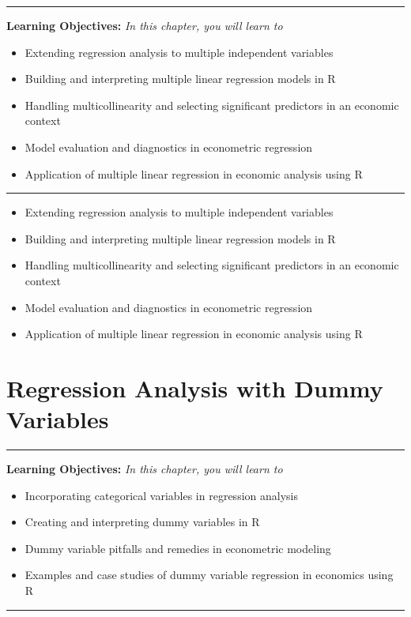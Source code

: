 \documentclass[
  letterpaper,
  twoside,
  openany]{scrbook}
\providecommand{\abstractname}{Learning Objectives} %
\newenvironment{objectives}[1]{%
	\hrule
	\vspace{5pt}
	\small\textbf{\abstractname: } 
	\newline
	\vspace{0.1cm}
	\small\emph{#1} %
	\itshape %
}{%
	\vspace{5pt}
	\hrule
	\vspace{0.6cm}
}
\begin{document}
\begin{objectives}{In this chapter, you will learn to}
\begin{itemize}

\item{Extending regression analysis to multiple independent variables}

\item{Building and interpreting multiple linear regression models in R}

\item{Handling multicollinearity and selecting significant predictors in an economic context}

\item{Model evaluation and diagnostics in econometric regression}

\item{Application of multiple linear regression in economic analysis using R}

\end{itemize}

\end{objectives}

\begin{itemize}
\item
  Extending regression analysis to multiple independent variables
\item
  Building and interpreting multiple linear regression models in R
\item
  Handling multicollinearity and selecting significant predictors in an
  economic context
\item
  Model evaluation and diagnostics in econometric regression
\item
  Application of multiple linear regression in economic analysis using R
\end{itemize}

\hypertarget{regression-analysis-with-dummy-variables}{%
\chapter{Regression Analysis with Dummy
Variables}\label{regression-analysis-with-dummy-variables}}

\begin{objectives}{In this chapter, you will learn to}
\begin{itemize}

\item{Incorporating categorical variables in regression analysis}

\item{Creating and interpreting dummy variables in R}

\item{Dummy variable pitfalls and remedies in econometric modeling}

\item{Examples and case studies of dummy variable regression in economics using R}

\end{itemize}

\end{objectives}
\end{document}
